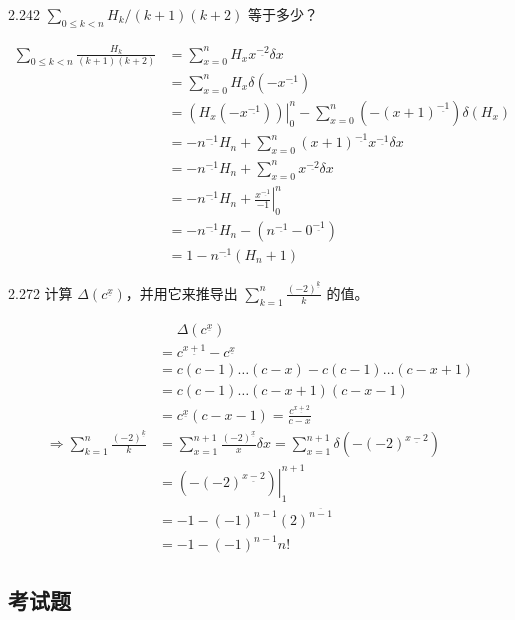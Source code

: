 \begin{problem}{2.24}{2}
  \( \sum_{0 \leq k < n} H_k / (k + 1)(k + 2) \) 等于多少？
\end{problem}

\begin{align*}
  \sum_{0 \leq k < n} \frac{H_k}{(k + 1) (k + 2)} &= \sum_{x=0}^n H_x x^{\underline{-2}} \delta x \\
  &= \sum_{x=0}^n H_x \delta (-x^{\underline{-1}}) \\
  &= \left. (H_x (-x^{\underline{-1}})) \right|_0^n - \sum_{x=0}^n (-(x+1)^{\underline{-1}}) \delta(H_x) \\
  &= -n^{\underline{-1}} H_n + \sum_{x=0}^n (x+1)^{\underline{-1}} x^{\underline{-1}} \delta x \\
  &= -n^{\underline{-1}} H_n + \sum_{x=0}^n x^{\underline{-2}} \delta x \\
  &= -n^{\underline{-1}} H_n + \left. \frac{x^{\underline{-1}}}{-1} \right|_0^n \\
  &= -n^{\underline{-1}} H_n - (n^{\underline{-1}} - 0^{\underline{-1}}) \\
  &= 1 - n^{\underline{-1}} (H_n + 1)
\end{align*}

\begin{problem}{2.27}{2}
  计算 \( \Delta (c^{\underline{x}}) \)，并用它来推导出 \( \sum_{k=1}^n \frac{(-2)^{\underline{k}}}{k} \) 的值。
\end{problem}

\begin{align*}
  &\phantom{=} \Delta (c^{\underline{x}}) \\
  &= c^{\underline{x+1}} - c^{\underline{x}} \\
  &= c(c-1) \dots (c-x) - c(c-1) \dots (c-x+1) \\
  &= c(c-1) \dots (c-x+1) (c-x-1) \\
  &= c^{\underline{x}} (c-x-1) = \frac{c^{\underline{x+2}}}{c-x} \\
  \Rightarrow \sum_{k=1}^n \frac{(-2)^{\underline{k}}}{k} &= \sum_{x=1}^{n+1} \frac{(-2)^{\underline{x}}}{x} \delta x = \sum_{x=1}^{n+1} \delta (-(-2)^{\underline{x-2}}) \\
  &= \left. (-(-2)^{\underline{x-2}}) \right|_1^{n+1} \\
  &= -1 - (-1)^{n-1} (2)^{\overline{n-1}} \\
  &= -1 - (-1)^{n-1} n!
\end{align*}

\subsection{考试题}

